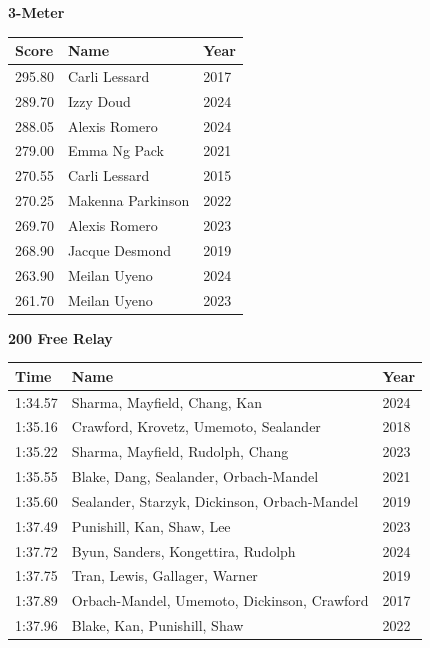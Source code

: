 \vspace{1.2em}
\noindent\begin{minipage}[t]{0.98\textwidth}
\centering
\textbf{\textcolor{teamprimary}{3-Meter}}\par
\vspace{0.5em}
\centering
\small
\renewcommand{\arraystretch}{1.0}
\setlength{\tabcolsep}{4pt}
\begin{tabular}{@{}p{1.8cm}p{3.0cm}p{1.0cm}@{}}
\toprule
\textbf{Score} & \textbf{Name} & \textbf{Year} \\
\midrule
295.80 & Carli Lessard & 2017 \\
289.70 & Izzy Doud & 2024 \\
288.05 & Alexis Romero & 2024 \\
279.00 & Emma Ng Pack & 2021 \\
270.55 & Carli Lessard & 2015 \\
270.25 & Makenna Parkinson & 2022 \\
269.70 & Alexis Romero & 2023 \\
268.90 & Jacque Desmond & 2019 \\
263.90 & Meilan Uyeno & 2024 \\
261.70 & Meilan Uyeno & 2023 \\
\bottomrule
\end{tabular}
\end{minipage}
\vspace{1.2em}
\noindent\begin{minipage}[t]{0.98\textwidth}
\centering
\textbf{\textcolor{teamprimary}{200 Free Relay}}\par
\vspace{0.5em}
\centering
\small
\renewcommand{\arraystretch}{1.0}
\setlength{\tabcolsep}{4pt}
\begin{tabular}{@{}p{4.5cm}p{8.5cm}p{2.5cm}@{}}
\toprule
\textbf{Time} & \textbf{Name} & \textbf{Year} \\
\midrule
1:34.57 & Sharma, Mayfield, Chang, Kan & 2024 \\
1:35.16 & Crawford, Krovetz, Umemoto, Sealander & 2018 \\
1:35.22 & Sharma, Mayfield, Rudolph, Chang & 2023 \\
1:35.55 & Blake, Dang, Sealander, Orbach-Mandel & 2021 \\
1:35.60 & Sealander, Starzyk, Dickinson, Orbach-Mandel & 2019 \\
1:37.49 & Punishill, Kan, Shaw, Lee & 2023 \\
1:37.72 & Byun, Sanders, Kongettira, Rudolph & 2024 \\
1:37.75 & Tran, Lewis, Gallager, Warner & 2019 \\
1:37.89 & Orbach-Mandel, Umemoto, Dickinson, Crawford & 2017 \\
1:37.96 & Blake, Kan, Punishill, Shaw & 2022 \\
\bottomrule
\end{tabular}
\end{minipage}
